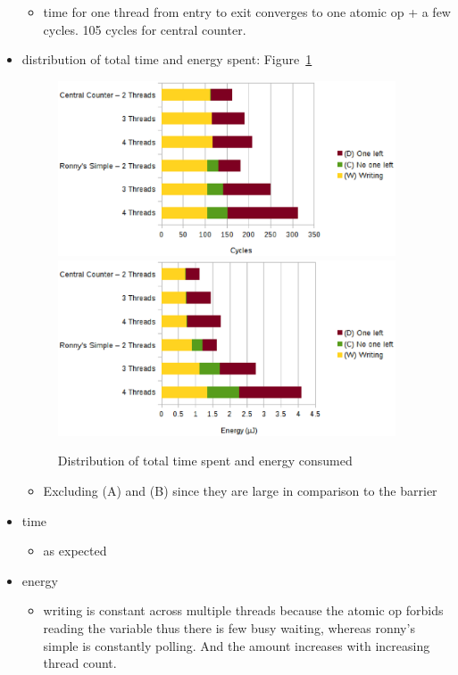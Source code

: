 \documentclass[a4paper, 10pt]{article}
\begin{document}
\begin{itemize}
\begin{itemize}
			\item time for one thread from entry to exit converges to one atomic op + a few cycles. 105 cycles for central counter.
		\end{itemize}
	\item distribution of total time and energy spent: Figure~\ref{fig:cs-work-1000-partition}
		\begin{figure}[htbp]
			\centering
			\includegraphics[width=10cm]{charts/cs-time-work-1000-partition}
			\includegraphics[width=10cm]{charts/cs-energy-work-1000-partition}
			\caption{Distribution of total time spent and energy consumed}
			\label{fig:cs-work-1000-partition}
		\end{figure}
		\begin{itemize}
			\item Excluding (A) and (B) since they are large in comparison to the barrier
		\end{itemize}
	\item time
		\begin{itemize}
			\item as expected
		\end{itemize}
	\item energy
		\begin{itemize}
			\item writing is constant across multiple threads because the atomic op forbids reading the variable thus there is few busy waiting, whereas ronny's simple is constantly polling. And the amount increases with increasing thread count.

\end{itemize}
\end{itemize}
\end{document}
